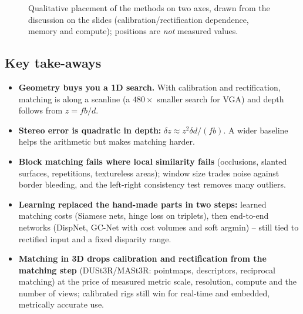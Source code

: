 \documentclass[11pt,a4paper]{article}
\theoremstyle{definition}
\theoremstyle{plain}
\theoremstyle{remark}
\begin{document}
\begin{figure}[H]\centering
{}
\caption{Qualitative placement of the methods on two axes, drawn from the discussion on the slides (calibration/rectification dependence, memory and compute); positions are \emph{not} measured values.}
\end{figure}

\subsection*{Key take-aways}
\begin{itemize}
\item \textbf{Geometry buys you a 1D search.} With calibration and rectification, matching is along a scanline (a $480\times$ smaller search for VGA) and depth follows from $z=fb/d$.
\item \textbf{Stereo error is quadratic in depth:} $\delta z\approx z^2\delta d/(fb)$. A wider baseline helps the arithmetic but makes matching harder.
\item \textbf{Block matching fails where local similarity fails} (occlusions, slanted surfaces, repetitions, textureless areas); window size trades noise against border bleeding, and the left-right consistency test removes many outliers.
\item \textbf{Learning replaced the hand-made parts in two steps:} learned matching costs (Siamese nets, hinge loss on triplets), then end-to-end networks (DispNet, GC-Net with cost volumes and soft argmin) -- still tied to rectified input and a fixed disparity range.
\item \textbf{Matching in 3D drops calibration and rectification from the matching step} (DUSt3R/MASt3R: pointmaps, descriptors, reciprocal matching) at the price of measured metric scale, resolution, compute and the number of views; calibrated rigs still win for real-time and embedded, metrically accurate use.
\end{itemize}
\end{document}
